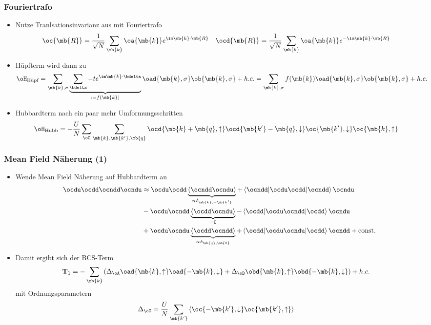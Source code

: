 \begin{frame}
	\frametitle{ Fouriertrafo }
    \begin{itemize}
        \item Nutze Tranlsationsinvarianz aus mit Fouriertrafo 
        \begin{align*}
            \oc{\mb{R}} &= \frac{1}{\sqrt{N}} \sum_{\mb{k}} \oa{\mb{k}} e^{\im \mb{k}\cdot \mb{R}} & \ocd{\mb{R}} &= \frac{1}{\sqrt{N}} \sum_{\mb{k}} \oa{\mb{k}} e^{- \im \mb{k}\cdot \mb{R}}
        \end{align*}
        \item Hüpfterm wird dann zu 
        \begin{align*}
            \oH_{\text{Hüpf}} &= \sum_{\mb{k}, \sigma} \underbrace{\sum_{\bdelta} -t e^{\im \mb{k}\cdot \bdelta}}_{:= f(\mb{k}) } \oad{\mb{k}, \sigma} \ob{\mb{k}, \sigma} + h.c. = \sum_{\mb{k}, \sigma} f(\mb{k}) \oad{\mb{k}, \sigma} \ob{\mb{k}, \sigma} + h.c.
        \end{align*}
        \item Hubbardterm nach ein paar mehr Umformungsschritten
        \begin{align*}
            \oH_{\text{Hubb}} &= -\frac{U}{N} \sum_{\oC} \sum_{\mb{k},\mb{k'},\mb{q}} \ocd{\mb{k}+\mb{q}, \uparrow} \ocd{\mb{k'} - \mb{q},\downarrow} \oc{\mb{k'}, \downarrow} \oc{\mb{k}, \uparrow}
        \end{align*}
    \end{itemize}
\end{frame}

\begin{frame}
	\frametitle{ Mean Field Näherung (1)}
    \begin{itemize}
        \item Wende Mean Field Näherung auf Hubbardterm an 
        \begin{align*}
            \ocdu \ocdd \ocndd \ocndu &\approx\ocdu \ocdd \underbrace{\expval{\ocndd \ocndu}}_{\propto \delta_{\mb{k}, -\mb{k'}}} + \expval{\ocdu \ocdd} \ocndd \ocndu \\
            &- \ocdu \ocndd \underbrace{\expval{\ocdd \ocndu}}_{= 0} - \expval{\ocdu \ocndd} \ocdd \ocndu \\
            &+ \ocdu \ocndu \underbrace{\expval{\ocdd \ocndd}}_{\propto \delta_{\mb{q}, \mb{0}}} + \expval{\ocdu \ocndu} \ocdd \ocndd + \text{const.}
        \end{align*}
        \item Damit ergibt sich der BCS-Term
        \begin{align*}
            \mathbf{T}_1 &= - \sum_{\mb{k}} \left(\Delta_{\oA} \oad{\mb{k},\uparrow} \oad{-\mb{k}, \downarrow} + \Delta_{\oB} \obd{\mb{k}, \uparrow} \obd{-\mb{k}, \downarrow}  \right) + h.c.
        \end{align*}
        mit Ordnungsparametern
        \begin{align*}
            \Delta_{\oC} &= \frac{U}{N} \sum_{\mb{k'}} \expval{\oc{-\mb{k'}, \downarrow } \oc{\mb{k'}, \uparrow} }
        \end{align*}
    \end{itemize}
\end{frame}

